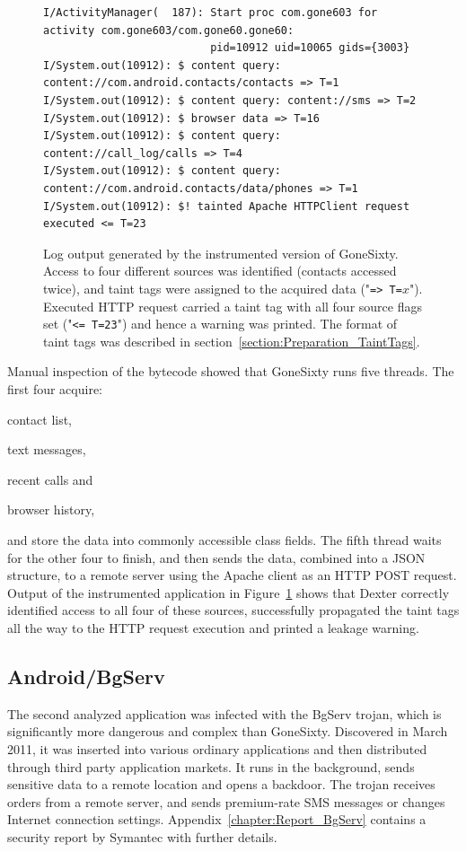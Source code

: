 \documentclass[12pt,twoside,notitlepage]{report}
\begin{document}
\begin{figure}[t]
	\scriptsize
	\begin{verbatim}
I/ActivityManager(  187): Start proc com.gone603 for activity com.gone603/com.gone60.gone60: 
                          pid=10912 uid=10065 gids={3003}
I/System.out(10912): $ content query: content://com.android.contacts/contacts => T=1
I/System.out(10912): $ content query: content://sms => T=2
I/System.out(10912): $ browser data => T=16
I/System.out(10912): $ content query: content://call_log/calls => T=4
I/System.out(10912): $ content query: content://com.android.contacts/data/phones => T=1
I/System.out(10912): $! tainted Apache HTTPClient request executed <= T=23
	\end{verbatim}
	\caption{Log output generated by the instrumented version of GoneSixty. Access to four different sources was identified (contacts accessed twice), and taint tags were assigned to the acquired data ("\texttt{=> T=$x$}"). Executed HTTP request carried a taint tag with all four source flags set ("\texttt{<= T=23}") and hence a warning was printed. The format of taint tags was described in section~\ref{section:Preparation_TaintTags}.}
	\label{figure:Evaluation_GoneSixty}
\end{figure}

Manual inspection of the bytecode showed that GoneSixty runs five threads. The first four acquire:
\begin{inparaenum}[(i)]
\item contact list,
\item text messages,
\item recent calls and
\item browser history,
\end{inparaenum}
and store the data into commonly accessible class fields. The fifth thread waits for the other four to finish, and then sends the data, combined into a JSON structure, to a remote server using the Apache client as an HTTP POST request. Output of the instrumented application in Figure~\ref{figure:Evaluation_GoneSixty} shows that Dexter correctly identified access to all four of these sources, successfully propagated the taint tags all the way to the HTTP request execution and printed a leakage warning. 

\subsection{Android/BgServ}

The second analyzed application was infected with the BgServ trojan, which is significantly more dangerous and complex than GoneSixty. Discovered in March 2011, it was inserted into various ordinary applications and then distributed through third party application markets. It runs in the background, sends sensitive data to a remote location and opens a backdoor. The trojan receives orders from a remote server, and sends premium-rate SMS messages or changes Internet connection settings. Appendix~\ref{chapter:Report_BgServ} contains a security report by Symantec with further details. 
\end{document}
